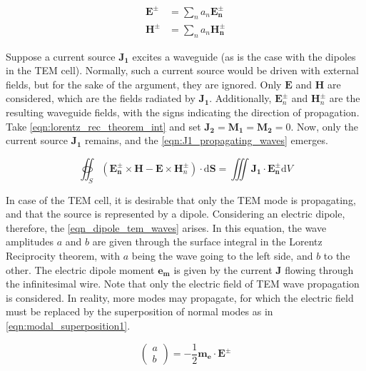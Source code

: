 \begin{align}
    \mathbf{E^\pm}&=\sum_na_n\mathbf{E_n^\pm}    \label{eqn:modal_superposition1}\\
    \mathbf{H^\pm}&=\sum_na_n\mathbf{H_n^\pm}    \label{eqn:modal_superposition2}
\end{align}

Suppose a current source $\mathbf{J_1}$ excites a waveguide (as is the case with the dipoles in the TEM cell). Normally, such a current source would be driven with external fields, but for the sake of the argument, they are ignored. Only $\mathbf{E}$ and $\mathbf{H}$ are considered, which are the fields radiated by $\mathbf{J_1}$. Additionally, $\mathbf{E}_n^\pm$ and $\mathbf{H}_n^\pm$ are the resulting waveguide fields, with the signs indicating the direction of propagation. Take \autoref{eqn:lorentz_rec_theorem_int} and set $\mathbf{J_2}=\mathbf{M_1}=\mathbf{M_2}=0$. Now, only the current source $\mathbf{J_1}$ remains, and the \autoref{eqn:J1_propagating_waves} emerges. %

\begin{equation}
    \oiint _S (\mathbf{E_n^\pm}\times \mathbf{H}-\mathbf{E}\times \mathbf{H}_n^\pm)\cdot\mathrm{d}\mathbf{S}=\iiint \mathbf{J_1}\cdot\mathbf{E_n^\pm}\mathrm{d}V
    \label{eqn:J1_propagating_waves}
\end{equation}

In case of the TEM cell, it is desirable that only the TEM mode is propagating, and that the source is represented by a dipole. Considering an electric dipole, therefore, the \autoref{eqn_dipole_tem_waves} arises. In this equation, the wave amplitudes $a$ and $b$ are given through the surface integral in the Lorentz Reciprocity theorem, with $a$ being the wave going to the left side, and $b$ to the other. The electric dipole moment $\mathbf{e_m}$ is given by the current $\mathbf{J}$ flowing through the infinitesimal wire. Note that only the electric field of TEM wave propagation is considered. In reality, more modes may propagate, for which the electric field must be replaced by the superposition of normal modes as in \autoref{eqn:modal_superposition1}. %

\begin{equation}
\begin{pmatrix}a \\b\end{pmatrix} = -\frac{1}{2}\mathbf{m_e}\cdot \mathbf{E}^\pm
\label{eqn_dipole_tem_waves}
\end{equation}

